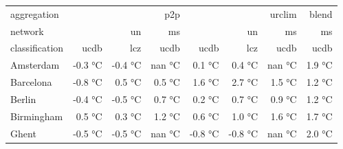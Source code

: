 \begin{table}
\thcenter
\begin{tabular}{lrrrrrrr}
aggregation & \multicolumn{3}{r}{p2p} & \multicolumn{3}{r}{urclim} & blend \\
network & \multicolumn{2}{r}{un} & ms & \multicolumn{2}{r}{un} & ms & ms \\
classification & ucdb & lcz & ucdb & ucdb & lcz & ucdb & ucdb \\
Amsterdam & {\cellcolor[HTML]{C4D5F3}} \color[HTML]{000000} -0.3 °C & {\cellcolor[HTML]{B9D0F9}} \color[HTML]{000000} -0.4 °C & {\cellcolor[HTML]{000000}} \color[HTML]{F1F1F1} nan °C & {\cellcolor[HTML]{E6D7CF}} \color[HTML]{000000} 0.1 °C & {\cellcolor[HTML]{F6BFA6}} \color[HTML]{000000} 0.4 °C & {\cellcolor[HTML]{000000}} \color[HTML]{F1F1F1} nan °C & {\cellcolor[HTML]{B40426}} \color[HTML]{F1F1F1} 1.9 °C \\
Barcelona & {\cellcolor[HTML]{89ACFD}} \color[HTML]{000000} -0.8 °C & {\cellcolor[HTML]{F7B79B}} \color[HTML]{000000} 0.5 °C & {\cellcolor[HTML]{F7B497}} \color[HTML]{000000} 0.5 °C & {\cellcolor[HTML]{B40426}} \color[HTML]{F1F1F1} 1.6 °C & {\cellcolor[HTML]{B40426}} \color[HTML]{F1F1F1} 2.7 °C & {\cellcolor[HTML]{B8122A}} \color[HTML]{F1F1F1} 1.5 °C & {\cellcolor[HTML]{D44E41}} \color[HTML]{F1F1F1} 1.2 °C \\
Berlin & {\cellcolor[HTML]{B1CBFC}} \color[HTML]{000000} -0.4 °C & {\cellcolor[HTML]{ABC8FD}} \color[HTML]{000000} -0.5 °C & {\cellcolor[HTML]{F5A081}} \color[HTML]{000000} 0.7 °C & {\cellcolor[HTML]{EFCFBF}} \color[HTML]{000000} 0.2 °C & {\cellcolor[HTML]{F6A283}} \color[HTML]{000000} 0.7 °C & {\cellcolor[HTML]{F08A6C}} \color[HTML]{F1F1F1} 0.9 °C & {\cellcolor[HTML]{D44E41}} \color[HTML]{F1F1F1} 1.2 °C \\
Birmingham & {\cellcolor[HTML]{F6BDA2}} \color[HTML]{000000} 0.5 °C & {\cellcolor[HTML]{F1CDBA}} \color[HTML]{000000} 0.3 °C & {\cellcolor[HTML]{DA5A49}} \color[HTML]{F1F1F1} 1.2 °C & {\cellcolor[HTML]{F7AC8E}} \color[HTML]{000000} 0.6 °C & {\cellcolor[HTML]{E36C55}} \color[HTML]{F1F1F1} 1.0 °C & {\cellcolor[HTML]{B40426}} \color[HTML]{F1F1F1} 1.6 °C & {\cellcolor[HTML]{B40426}} \color[HTML]{F1F1F1} 1.7 °C \\
Ghent & {\cellcolor[HTML]{A7C5FE}} \color[HTML]{000000} -0.5 °C & {\cellcolor[HTML]{A7C5FE}} \color[HTML]{000000} -0.5 °C & {\cellcolor[HTML]{000000}} \color[HTML]{F1F1F1} nan °C & {\cellcolor[HTML]{89ACFD}} \color[HTML]{000000} -0.8 °C & {\cellcolor[HTML]{89ACFD}} \color[HTML]{000000} -0.8 °C & {\cellcolor[HTML]{000000}} \color[HTML]{F1F1F1} nan °C & {\cellcolor[HTML]{B40426}} \color[HTML]{F1F1F1} 2.0 °C \\

\end{tabular}
\end{table}
